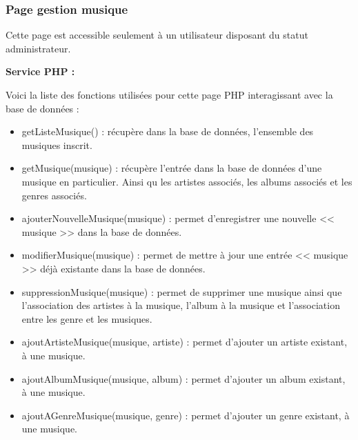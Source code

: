         
        
        
        
        
        
        
        
        
        
        
        
        
        
        
        
        
        
        
        
        
        
    \newpage

		\subsubsection{Page gestion musique}

			\begin{paragraphe}
				Cette page est accessible seulement à un utilisateur disposant du statut administrateur.
			\end{paragraphe}

			\begin{paragraphe}
				\textbf{Service PHP :}
			\end{paragraphe}

			\begin{paragraphe}
				Voici la liste des fonctions utilisées pour cette page PHP interagissant avec la base de données :
			\end{paragraphe}

			\begin{paragraphe}
				\begin{itemize}
					\item getListeMusique() : récupère dans la base de données, l'ensemble des musiques inscrit.
					\item getMusique(musique) : récupère l'entrée dans la base de données d'une musique en particulier. Ainsi qu les artistes associés, les albums associés et les genres associés.
					\item ajouterNouvelleMusique(musique) : permet d'enregistrer une nouvelle << musique >> dans la base de données.
					\item modifierMusique(musique) : permet de mettre à jour une entrée << musique >> déjà existante dans la base de données.
					\item suppressionMusique(musique) : permet de supprimer une musique ainsi que l'association des artistes à la musique, l'album à la musique et l'association entre les genre et les musiques.
					\item ajoutArtisteMusique(musique, artiste) : permet d'ajouter un artiste existant, à une musique.
					\item ajoutAlbumMusique(musique, album) : permet d'ajouter un album existant, à une musique.
					\item ajoutAGenreMusique(musique, genre) : permet d'ajouter un genre existant, à une musique.
				\end{itemize}
			\end{paragraphe}

